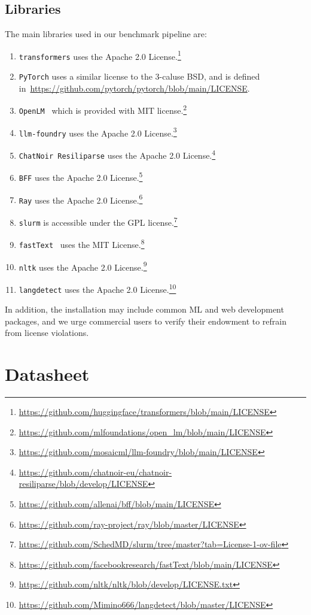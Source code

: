 \documentclass{article}
\newcommand{\fasttext}{\texttt{fastText}\xspace}
\begin{document}
\subsection{Libraries}
The main libraries used in our benchmark pipeline are:
\begin{enumerate}
    \item \texttt{transformers} uses the Apache 2.0 License.\footnote{ \url{https://github.com/huggingface/transformers/blob/main/LICENSE}}
    \item \texttt{PyTorch} uses a similar license to the 3-caluse BSD, and is defined in~\url{https://github.com/pytorch/pytorch/blob/main/LICENSE}.
    \item \texttt{OpenLM}~\citep{open_lm} which is provided with MIT license.\footnote{\url{https://github.com/mlfoundations/open_lm/blob/main/LICENSE}}
    \item \texttt{llm-foundry} uses the Apache 2.0 License.\footnote{\url{https://github.com/mosaicml/llm-foundry/blob/main/LICENSE}}
    \item \texttt{ChatNoir Resiliparse} uses the Apache 2.0 License.\footnote{\url{https://github.com/chatnoir-eu/chatnoir-resiliparse/blob/develop/LICENSE}}
    \item \texttt{BFF} uses the Apache 2.0 License.\footnote{\url{https://github.com/allenai/bff/blob/main/LICENSE}}
    \item \texttt{Ray} uses the Apache 2.0 License.\footnote{\url{https://github.com/ray-project/ray/blob/master/LICENSE}}
    \item \texttt{slurm} is accessible under the GPL license.\footnote{\url{https://github.com/SchedMD/slurm/tree/master?tab=License-1-ov-file}}
    \item \fasttext~\citep{joulin2017bag} uses the MIT License.\footnote{\url{https://github.com/facebookresearch/fastText/blob/main/LICENSE}}
    \item \texttt{nltk} uses the Apache 2.0 License.\footnote{\url{https://github.com/nltk/nltk/blob/develop/LICENSE.txt}}
    \item \texttt{langdetect} uses the Apache 2.0 License.\footnote{\url{https://github.com/Mimino666/langdetect/blob/master/LICENSE}}
\end{enumerate}
In addition, the installation may include common ML and web development packages, and we urge commercial users to verify their endowment to refrain from license violations.

\clearpage

\section{Datasheet}\label{appx:datasheet}
\end{document}
